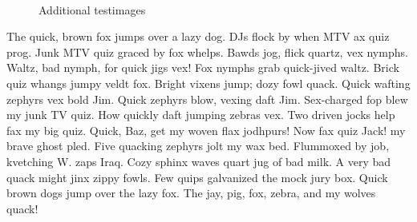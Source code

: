 \begin{figure}[t]
{    }
    \hspace{1.5cm}%
    \\
    \caption[Additional testimages]{Additional testimages}
        \label{fig_testimage2}
    \end{figure}

The quick, brown fox jumps over a lazy dog. DJs flock by when MTV ax quiz prog. Junk MTV quiz graced by fox whelps. Bawds jog, flick quartz, vex nymphs. Waltz, bad nymph, for quick jigs vex! Fox nymphs grab quick-jived waltz. Brick quiz whangs jumpy veldt fox. Bright vixens jump; dozy fowl quack. Quick wafting zephyrs vex bold Jim. Quick zephyrs blow, vexing daft Jim. Sex-charged fop blew my junk TV quiz. How quickly daft jumping zebras vex. Two driven jocks help fax my big quiz. Quick, Baz, get my woven flax jodhpurs! Now fax quiz Jack! my brave ghost pled. Five quacking zephyrs jolt my wax bed. Flummoxed by job, kvetching W. zaps Iraq. Cozy sphinx waves quart jug of bad milk. A very bad quack might jinx zippy fowls. Few quips galvanized the mock jury box. Quick brown dogs jump over the lazy fox. The jay, pig, fox, zebra, and my wolves quack!

